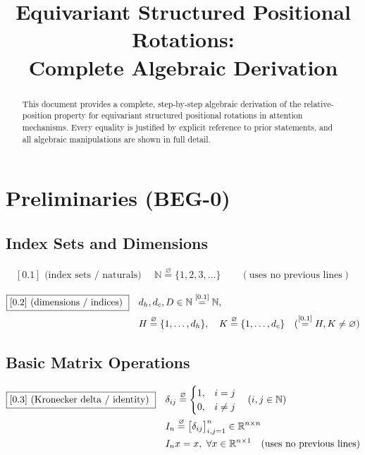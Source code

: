 \documentclass[11pt]{article}
\title{Equivariant Structured Positional Rotations:\\Complete Algebraic Derivation}
\author{}
\date{}
\newcommand{\eqdef}{\overset{\varnothing}{=}}
\newcommand{\eqref}[1]{\overset{[#1]}{=}}
\begin{document}
\maketitle

\begin{abstract}
This document provides a complete, step-by-step algebraic derivation of the relative-position property for equivariant structured positional rotations in attention mechanisms. Every equality is justified by explicit reference to prior statements, and all algebraic manipulations are shown in full detail.
\end{abstract}

\tableofcontents
\newpage

\section{Preliminaries (BEG-0)}

\subsection{Index Sets and Dimensions}

\begin{align}
\boxed{[0.1] \text{ (index sets / naturals) }} \quad
\mathbb{N} \eqdef \{1,2,3,\dots\}
\qquad(\text{uses no previous lines})
\end{align}

\begin{align}
\boxed{[0.2] \text{ (dimensions / indices) }} \quad
&d_h,d_c,D \in \mathbb{N} \eqref{0.1} \mathbb{N}, \notag\\
&H \eqdef \{1,\dots,d_h\}, \quad
K \eqdef \{1,\dots,d_c\} \quad(\eqref{0.1} H,K\neq\varnothing)
\end{align}

\subsection{Basic Matrix Operations}

\begin{align}
\boxed{[0.3] \text{ (Kronecker delta / identity) }} \quad
&\delta_{ij} \eqdef
\begin{cases}
1,& i=j\\
0,& i\neq j
\end{cases}
\quad(i,j\in\mathbb{N}) \notag\\
&I_n \eqdef
\big[\delta_{ij}\big]_{i,j=1}^n
\in \mathbb{R}^{n\times n} \notag\\
&I_n x = x,\ \forall x\in \mathbb{R}^{n\times 1}
\quad(\text{uses no previous lines})
\end{align}
\end{document}

